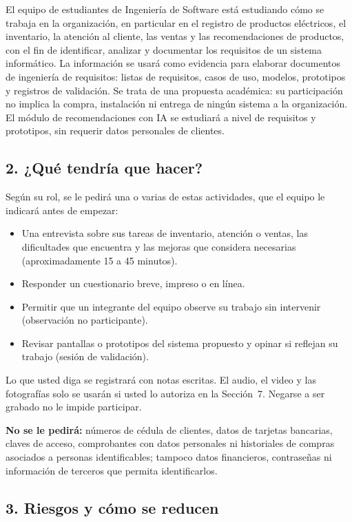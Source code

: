 El equipo de estudiantes de Ingeniería de Software está estudiando cómo se trabaja en la organización, en particular en el registro de productos eléctricos, el inventario, la atención al cliente, las ventas y las recomendaciones de productos, con el fin de identificar, analizar y documentar los requisitos de un sistema informático. La información se usará como evidencia para elaborar documentos de ingeniería de requisitos: listas de requisitos, casos de uso, modelos, prototipos y registros de validación. Se trata de una propuesta académica: su participación no implica la compra, instalación ni entrega de ningún sistema a la organización. El módulo de recomendaciones con IA se estudiará a nivel de requisitos y prototipos, sin requerir datos personales de clientes.

\subsection*{2. ¿Qué tendría que hacer?}

Según su rol, se le pedirá una o varias de estas actividades, que el equipo le indicará antes de empezar:
\begin{itemize}[leftmargin=*]
\item Una entrevista sobre sus tareas de inventario, atención o ventas, las dificultades que encuentra y las mejoras que considera necesarias (aproximadamente 15 a 45 minutos).
\item Responder un cuestionario breve, impreso o en línea.
\item Permitir que un integrante del equipo observe su trabajo sin intervenir (observación no participante).
\item Revisar pantallas o prototipos del sistema propuesto y opinar si reflejan su trabajo (sesión de validación).
\end{itemize}
Lo que usted diga se registrará con notas escritas. El audio, el video y las fotografías solo se usarán si usted lo autoriza en la Sección~7. Negarse a ser grabado no le impide participar.

\textbf{No se le pedirá:} números de cédula de clientes, datos de tarjetas bancarias, claves de acceso, comprobantes con datos personales ni historiales de compras asociados a personas identificables; tampoco datos financieros, contraseñas ni información de terceros que permita identificarlos.

\subsection*{3. Riesgos y cómo se reducen}


